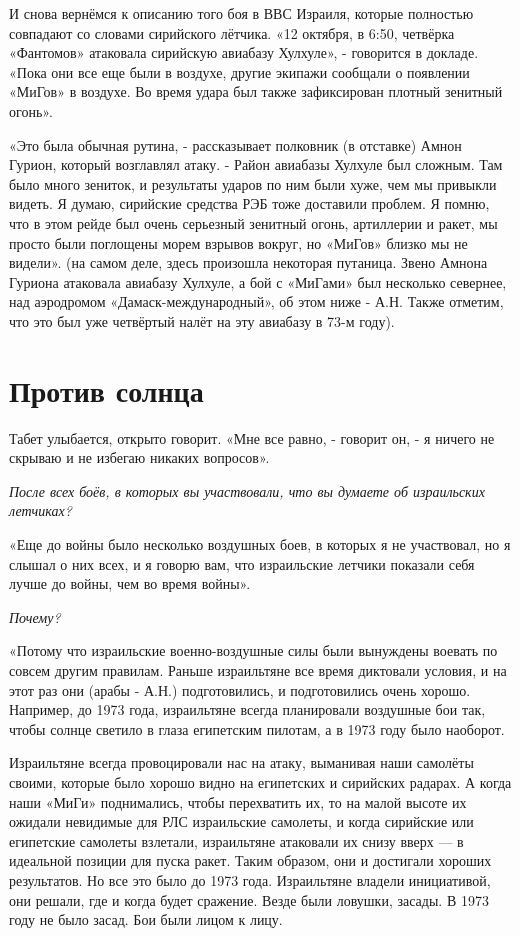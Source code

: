 И снова вернёмся к описанию того боя в ВВС Израиля, которые полностью совпадают со словами сирийского лётчика. «12 октября, в 6:50, четвёрка «Фантомов» атаковала сирийскую авиабазу Хулхуле», - говорится в докладе. «Пока они все еще были в воздухе, другие экипажи сообщали о появлении «МиГов» в воздухе. Во время удара был также зафиксирован плотный зенитный огонь».

«Это была обычная рутина, - рассказывает полковник (в отставке) Амнон Гурион, который возглавлял атаку. - Район авиабазы Хулхуле был сложным. Там было много зениток, и результаты ударов по ним были хуже, чем мы привыкли видеть. Я думаю, сирийские средства РЭБ тоже доставили проблем. Я помню, что в этом рейде был очень серьезный зенитный огонь, артиллерии и ракет, мы просто были поглощены морем взрывов вокруг, но «МиГов» близко мы не видели». (на самом деле, здесь произошла некоторая путаница. Звено Амнона Гуриона атаковала авиабазу Хулхуле, а бой с «МиГами» был несколько севернее, над аэродромом «Дамаск-международный», об этом ниже - А.Н. Также отметим, что это был уже четвёртый налёт на эту авиабазу в 73-м году). 

\section{Против солнца}

Табет улыбается, открыто говорит. «Мне все равно, - говорит он, - я ничего не скрываю и не избегаю никаких вопросов».

\textit{После всех боёв, в которых вы участвовали, что вы думаете об израильских летчиках? }

«Еще до войны было несколько воздушных боев, в которых я не участвовал, но я слышал о них всех, и я говорю вам, что израильские летчики показали себя лучше до войны, чем во время войны».

\textit{Почему?}

«Потому что израильские военно-воздушные силы были вынуждены воевать по совсем другим правилам. Раньше израильтяне все время диктовали условия, и на этот раз они (арабы - А.Н.) подготовились, и подготовились очень хорошо. Например, до 1973 года, израильтяне всегда планировали воздушные бои так, чтобы солнце светило в глаза египетским пилотам, а в 1973 году было наоборот.

Израильтяне всегда провоцировали нас на атаку, выманивая наши самолёты своими, которые было хорошо видно на египетских и сирийских радарах. А когда наши «МиГи» поднимались, чтобы перехватить их, то на малой высоте их ожидали невидимые для РЛС израильские самолеты, и когда сирийские или египетские самолеты взлетали, израильтяне атаковали их снизу вверх — в идеальной позиции для пуска ракет. Таким образом, они и достигали хороших результатов. Но все это было до 1973 года. Израильтяне владели инициативой, они решали, где и когда будет сражение. Везде были ловушки, засады. В 1973 году не было засад. Бои были лицом к лицу.


